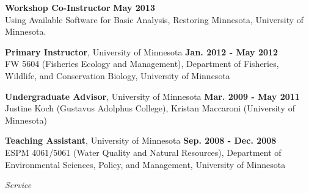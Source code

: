 \documentclass[letterpaper,12pt]{article}
\newcommand{\sectitle}[1]{\vspace{\baselineskip} \centerline{\large{\textit{#1}}}}
\begin{document}
{\bf Workshop Co-Instructor} \hfill {\bf May 2013} \\
Using Available Software for Basic Analysis, Restoring Minnesota, University of Minnesota.

{\bf Primary Instructor}, University of Minnesota \hfill {\bf Jan. 2012 - May 2012} \\
FW 5604 (Fisheries Ecology and Management), Department of Fisheries, Wildlife, and Conservation Biology, University of Minnesota

{\bf Undergraduate Advisor}, University of Minnesota \hfill {\bf Mar. 2009 - May 2011} \\
Justine Koch (Gustavus Adolphus College), Kristan Maccaroni (University of Minnesota)

{\bf Teaching Assistant}, University of Minnesota \hfill {\bf Sep. 2008 - Dec. 2008} \\
ESPM 4061/5061 (Water Quality and Natural Resources), Department of Environmental Sciences, Policy, and Management, University of Minnesota

\sectitle{Service}
\end{document}
